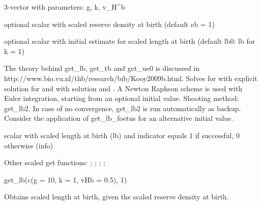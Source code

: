 \documentclass[a4paper]{book}
\begin{document}
%
\begin{Arguments}
\begin{ldescription}
\item[\code{pars}] 3-vector with parameters: g, k, v\_H\textasciicircum{}b

\item[\code{eb}] optional scalar with scaled reserve density at birth (default eb = 1)

\item[\code{lb0}] optional scalar with initial estimate for scaled length at birth (default lb0: lb for k = 1)
\end{ldescription}
\end{Arguments}
%
\begin{Details}\relax
The theory behind get\_lb, get\_tb and get\_ue0 is discussed in http://www.bio.vu.nl/thb/research/bib/Kooy2009b.html.
Solves   for  with explicit solution for 
and 
with solution 
and .
A Newton Raphson scheme is used with Euler integration, starting from an optional initial value.
Shooting method: get\_lb2.
In case of no convergence, get\_lb2 is run automatically as backup.
Consider the application of get\_lb\_foetus for an alternative initial value.
\end{Details}
%
\begin{Value}
scalar with scaled length at birth (lb) and indicator equals 1 if successful, 0 otherwise (info)
\end{Value}
%
\begin{SeeAlso}\relax
Other scaled get functions: ;
; ;
;
\end{SeeAlso}
%
\begin{Examples}
\begin{ExampleCode}
get_lb(c(g = 10, k = 1, vHb = 0.5), 1)
\end{ExampleCode}
\end{Examples}
%
\begin{Description}\relax
Obtains scaled length at birth, given the scaled reserve density at birth.
\end{Description}
\end{document}
